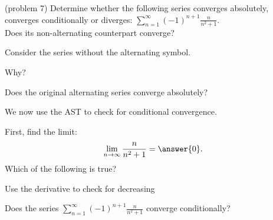 \documentclass[handout]{ximera}
\begin{document}
\begin{problem}(problem 7)
Determine whether the following series converges absolutely, converges conditionally or diverges: $\displaystyle{\sum_{n=1}^\infty (-1)^{n+1} \frac{n}{n^2 + 1}}$.\\
Does its non-alternating counterpart converge?
\begin{hint} 
Consider the series without the alternating symbol.
\end{hint}
\begin{multipleChoice}
\end{multipleChoice}

Why?
\begin{multipleChoice}
\end{multipleChoice}




Does the original alternating series converge absolutely?
\begin{multipleChoice}
\end{multipleChoice}

We now use the AST to check for conditional convergence.

First, find the limit:
\[
\lim_{n\to\infty} \frac{n}{n^2 + 1} = \answer{0}.
\]
Which of the following is true? 
\begin{hint}
Use the derivative to check for decreasing
\end{hint}
\begin{multipleChoice}
\end{multipleChoice}


Does the series $\displaystyle{\sum_{n=1}^\infty (-1)^{n+1} \frac{n}{n^2 + 1}}$ converge conditionally?
\begin{multipleChoice}
\end{multipleChoice}

\end{problem}
\end{document}
